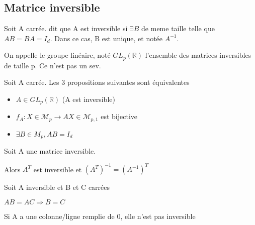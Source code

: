 \documentclass[french]{yLectureNote}
\newcommand{\R}[0]{\mathbb{R}}
\newcommand{\mc}{\mathcal}
\begin{document}
\subsection{Matrice inversible}
\begin{definition}
Soit A carrée. dit que A est inversible si \(\exists B\) de meme taille telle que \(AB = BA = I_d\). Dans ce cas, B est unique, et notée \(A^{-1}\).
\end{definition}
On appelle le groupe linéaire, noté \(GL_p(\R)\) l'ensemble des matrices inversibles de taille p. Ce n'est pas un sev.
\begin{proposition}
Soit A carrée. Les 3 propositions suivantes sont équivalentes
\begin{itemize}
 \item \(A\in GL_p(\R)\) (A est inversible)
 \item \(f_A : X\in \mc{M}_p \to AX \in \mc{M}_{p,1}\) est bijective
 \item \(\exists B\in M_p, AB=I_d\)
\end{itemize}

\end{proposition}
\begin{proposition}
Soit A une matrice inversible.

Alors \(A^T\) est inversible et \((A^T)^{-1} = (A^{-1})^T\)
\end{proposition}
\begin{proposition}
Soit A inversible et B et C carrées

\(AB=AC \Rightarrow B=C\)
\end{proposition}
\begin{proposition}
Si A a une colonne/ligne remplie de 0, elle n'est pas inversible
\end{proposition}
\end{document}
